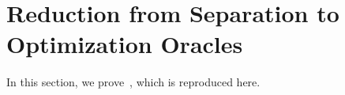 \section{Reduction from Separation to Optimization Oracles}\label{section-oracles}

In this section, we prove~, which is reproduced here. 




